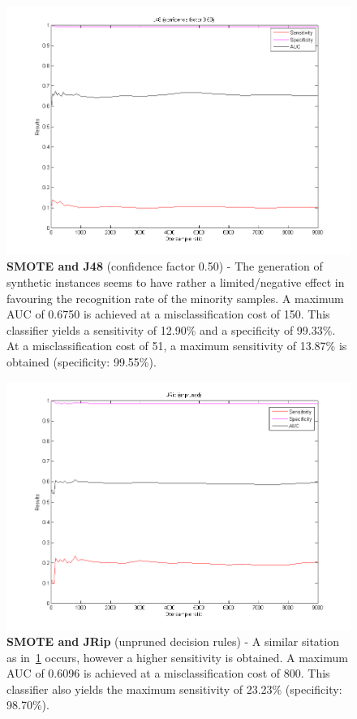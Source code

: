 \begin{figure}[h]
\includegraphics[scale=0.65]{img/SMOTE_J48-confid-050.png}
\caption{\textbf{SMOTE and J48} (confidence factor 0.50) - The generation of synthetic instances seems to have rather a limited/negative effect in favouring the recognition rate of the minority samples. A maximum AUC of 0.6750 is achieved at a  misclassification cost of 150. This classifier yields a sensitivity of 12.90\% and a specificity of 99.33\%. At a misclassification cost of 51, a maximum sensitivity of 13.87\% is obtained (specificity: 99.55\%).
}
\label{fig:exp-smote-j48}
\end{figure}

\newpage
\begin{figure}[h]
\includegraphics[scale=0.65]{img/SMOTE_JRip-unpruned.png}
\caption{\textbf{SMOTE and JRip} (unpruned decision rules) - A similar sitation as in~\ref{fig:exp-smote-j48} occurs, however a higher sensitivity is obtained. A maximum AUC of 0.6096 is achieved at a misclassification cost of 800. This classifier also yields the maximum sensitivity of 23.23\% (specificity: 98.70\%).}
\end{figure}

